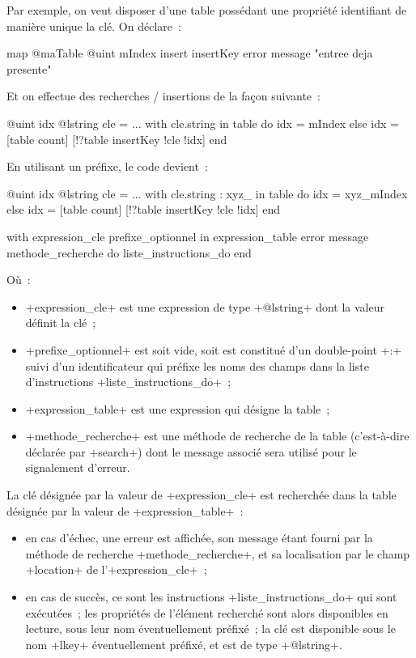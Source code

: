 Par exemple, on veut disposer d'une table possédant une propriété identifiant de manière unique la clé. On déclare~:
\begin{galgas3}
map @maTable {
  @uint mIndex
  insert insertKey error message "entree deja presente"
}
\end{galgas3}

Et on effectue des recherches / insertions de la façon suivante~:
\begin{galgas3}
@uint idx
@lstring cle = ...
with cle.string in table do
  idx = mIndex
else
  idx = [table count]
  [!?table insertKey !cle !idx]
end
\end{galgas3}

En utilisant un préfixe, le code devient~:
\begin{galgas3}
@uint idx
@lstring cle = ...
with cle.string : xyz_ in table do
  idx = xyz_mIndex
else
  idx = [table count]
  [!?table insertKey !cle !idx]
end
\end{galgas3}






\begin{galgas3}
with expression_cle prefixe_optionnel in expression_table
error message methode_recherche
do
  liste_instructions_do
end
\end{galgas3}

Où~:
\begin{itemize}
  \item \ggst+expression_cle+ est une expression de type \ggst+@lstring+ dont la valeur définit la clé~;
  \item \ggst+prefixe_optionnel+ est soit vide, soit est constitué d'un double-point \ggst+:+ suivi d'un identificateur qui préfixe les noms des champs dans la liste d'instructions \ggst+liste_instructions_do+~;
  \item \ggst+expression_table+ est une expression qui désigne la table~;
  \item \ggst+methode_recherche+ est une méthode de recherche de la table (c'est-à-dire déclarée par \ggst+search+) dont le message associé sera utilisé pour le signalement d'erreur.
\end{itemize}

La clé désignée par la valeur de \ggst+expression_cle+ est recherchée dans la table désignée par la valeur de \ggst+expression_table+~:
\begin{itemize}
  \item en cas d'échec, une erreur est affichée, son message étant fourni par la méthode de recherche \ggst+methode_recherche+, et sa localisation par le champ \ggst+location+ de l'\ggst+expression_cle+~;
  \item en cas de succès, ce sont les instructions \ggst+liste_instructions_do+ qui sont exécutées~; les propriétés de l'élément recherché sont alors disponibles en lecture, sous leur nom éventuellement préfixé~; la clé est disponible sous le nom \ggst+lkey+ éventuellement préfixé, et est de type \ggst+@lstring+.
\end{itemize}

